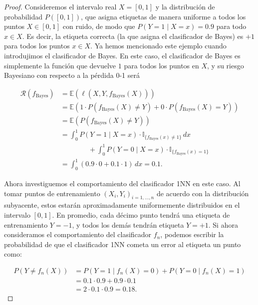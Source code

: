 \documentclass{article}
\begin{document}
\begin{proof}

Consideremos 
el intervalo real \(X = [0, 1]\) y la distribución de probabilidad \(P([0, 1])\),  que asigna etiquetas 
de manera uniforme a todos los puntos \(X \in [0, 1]\) con ruido, de modo que 
\(P(Y = 1 \mid X = x) = 0.9\) para todo \(x \in X\). Es decir, la etiqueta correcta (la que 
asigna el clasificador de Bayes) es \(+1\) para todos los puntos \(x \in X\). Ya hemos mencionado 
este ejemplo cuando introdujimos el clasificador de Bayes. En este caso, el clasificador de Bayes 
es simplemente la función que devuelve \(1\) para todos los puntos en \(X\), y su riesgo Bayesiano 
con respecto a la pérdida 0-1 será

\[
\begin{aligned}
    \mathcal{R}(f_{\text{Bayes}}) & = \mathbb{E}(\ell(X,Y,f_{\text{Bayes}}(X))) \\
    & = \mathbb{E}(1\cdot P(f_{\text{Bayes}}(X)\neq Y) + 0 \cdot P(f_{\text{Bayes}}(X) = Y))\\
    & = \mathbb{E}(P(f_{\text{Bayes}}(X)\neq Y))\\
    & = \int_{0}^{1} P(Y = 1 \mid X = x) \cdot \mathbb{I}_{\{f_{\text{Bayes}}(x) \neq 1\}} \, dx \\
    & \qquad \qquad + \int_{0}^{1} P(Y=0 \mid X=x) \cdot \mathbb{I}_{\{f_{\text{Bayes}}(x) = 1\}} \\
    & = \int_{0}^{1} (0.9 \cdot 0 + 0.1 \cdot 1) \, dx = 0.1.
\end{aligned}
\]

Ahora investiguemos el comportamiento del clasificador 1NN 
en este caso. Al tomar puntos de entrenamiento \((X_i, Y_i)_{i=1,\dots,n}\) de acuerdo con la 
distribución subyacente, estos estarán aproximadamente uniformemente distribuidos en el intervalo 
\([0, 1]\). En promedio, cada décimo punto tendrá una etiqueta de entrenamiento \(Y = -1\), y todos 
los demás tendrán etiqueta \(Y = +1\). Si ahora consideramos el comportamiento del clasificador \(f_n\), 
podemos escribir la probabilidad de que el clasificador 1NN cometa un error al etiqueta un punto como:

\[
\begin{aligned}
P(Y \neq f_n(X)) & = P(Y = 1 \mid f_n(X) = 0) + P(Y = 0 \mid f_n(X) = 1) \\
                 & = 0.1 \cdot 0.9 + 0.9 \cdot 0.1 \\
                 & = 2 \cdot 0.1 \cdot 0.9 = 0.18.
\end{aligned}
\]


\end{proof}
\end{document}
